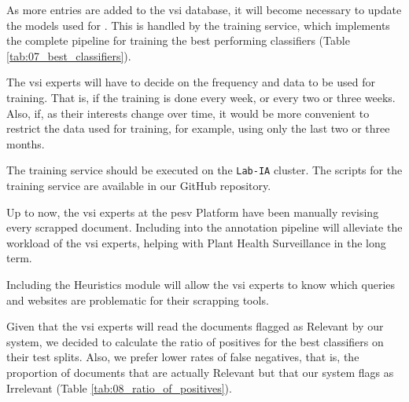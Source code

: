 \label{08_training_service}

As more entries are added to the \gls{vsi} database, it will become necessary to update the models used for \textclassification{}. This is handled by the training service, which implements the complete pipeline for training the best performing classifiers (Table \ref{tab:07_best_classifiers}).

The \gls{vsi} experts will have to decide on the frequency and data to be used for training. 
That is, if the training is done every week, or every two or three weeks. Also, if, as their interests change over time, it would be more convenient to restrict the data used for training, for example, using only the last two or three months.

The training service should be executed on the \texttt{Lab-IA} cluster. The scripts for the training service are available in our GitHub repository.



\label{08_consequences}

Up to now, the \gls{vsi} experts at the \gls{pesv} Platform have been manually revising every scrapped document. Including \textclassification{} into the annotation pipeline will alleviate the workload of the \gls{vsi} experts, helping with Plant Health Surveillance in the long term.

Including the Heuristics module will allow the \gls{vsi} experts to know which queries and websites are problematic for their scrapping tools. 

Given that the \gls{vsi} experts will read the documents flagged as Relevant by our system, we decided to calculate the ratio of positives for the best classifiers on their test splits. Also, we prefer lower rates of false negatives, that is, the proportion of documents that are actually Relevant but that our system flags as Irrelevant (Table \ref{tab:08_ratio_of_positives}).


